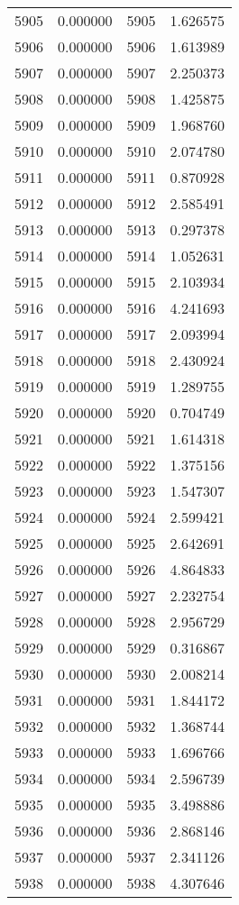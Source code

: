 \documentclass[12pt]{article}
\begin{document}
\begin{longtable}{@{}cccc@{}}
5905 & 0.000000 & 5905 & 1.626575 \\
5906 & 0.000000 & 5906 & 1.613989 \\
5907 & 0.000000 & 5907 & 2.250373 \\
5908 & 0.000000 & 5908 & 1.425875 \\
5909 & 0.000000 & 5909 & 1.968760 \\
5910 & 0.000000 & 5910 & 2.074780 \\
5911 & 0.000000 & 5911 & 0.870928 \\
5912 & 0.000000 & 5912 & 2.585491 \\
5913 & 0.000000 & 5913 & 0.297378 \\
5914 & 0.000000 & 5914 & 1.052631 \\
5915 & 0.000000 & 5915 & 2.103934 \\
5916 & 0.000000 & 5916 & 4.241693 \\
5917 & 0.000000 & 5917 & 2.093994 \\
5918 & 0.000000 & 5918 & 2.430924 \\
5919 & 0.000000 & 5919 & 1.289755 \\
5920 & 0.000000 & 5920 & 0.704749 \\
5921 & 0.000000 & 5921 & 1.614318 \\
5922 & 0.000000 & 5922 & 1.375156 \\
5923 & 0.000000 & 5923 & 1.547307 \\
5924 & 0.000000 & 5924 & 2.599421 \\
5925 & 0.000000 & 5925 & 2.642691 \\
5926 & 0.000000 & 5926 & 4.864833 \\
5927 & 0.000000 & 5927 & 2.232754 \\
5928 & 0.000000 & 5928 & 2.956729 \\
5929 & 0.000000 & 5929 & 0.316867 \\
5930 & 0.000000 & 5930 & 2.008214 \\
5931 & 0.000000 & 5931 & 1.844172 \\
5932 & 0.000000 & 5932 & 1.368744 \\
5933 & 0.000000 & 5933 & 1.696766 \\
5934 & 0.000000 & 5934 & 2.596739 \\
5935 & 0.000000 & 5935 & 3.498886 \\
5936 & 0.000000 & 5936 & 2.868146 \\
5937 & 0.000000 & 5937 & 2.341126 \\
5938 & 0.000000 & 5938 & 4.307646 \\

\end{longtable}
\end{document}
